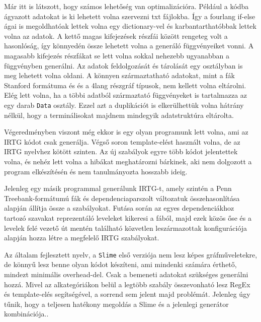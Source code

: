 Már itt is látszott, hogy számos lehetőség van optimalizációra. 
Például a kódba ágyazott adatokat is ki lehetett volna szervezni txt fájlokba. 
Így a fourlang if-else ágai is megoldhatóak lettek volna egy dictionary-vel és karbantarthatóbbak lettek volna az adatok. 
A kettő magas kifejezések részfái között rengeteg volt a hasonlóság, így könnyedén össze lehetett volna a generáló függvényeiket vonni. 
A magasabb kifejezés részfákat se lett volna sokkal nehezebb ugyanabban a függvényben generálni. 
Az adatok feldolgozását és tárolását egy osztályban is meg lehetett volna oldani. 
A könnyen származtatható adatokat, mint a fák Stanford formátuma és és a 4lang részgráf típusok, nem kellett volna eltárolni. 
Elég lett volna, ha a többi adatból származtató függvényeket is tartalmazza az egy darab \texttt{Data} osztály. 
Ezzel azt a duplikációt is elkerülhettük volna hátrány nélkül, hogy a terminálisokat majdnem mindegyik adatstruktúra eltárolta.

Végeredményben viszont még ekkor is egy olyan programunk lett volna, ami az IRTG kódot csak generálja. 
Végső soron template-elést használt volna, de az IRTG nyelvhez kötött szinten. 
Az új szabályok egyre több kódot jelentettek volna, és nehéz lett volna a hibákat meghatározni bárkinek, aki nem dolgozott a program elkészítésén és nem tanulmányozta hosszabb ideig.

Jelenleg egy másik programmal generálunk IRTG-t, amely szintén a Penn Treebank-formátumú fák és dependenciaparszolt változatuk összehasonlítása alapján állítja össze a szabályokat. 
Futása során az egyes dependenciákhoz tartozó szavakat reprezentáló leveleket kikeresi a fából, majd ezek közös őse és a levelek felé vezető út mentén található közvetlen leszármazottak konfigurációja alapján hozza létre a megfelelő IRTG szabályokat.

Az általam fejlesztett nyelv, a \texttt{Slime} első verziója nem lesz képes gráfműveletekre, de könnyű lesz benne olyan kódot készíteni, ami mindenki számára érthető, mindezt minimális overhead-del.
Csak a bemeneti adatokat szükséges generálni hozzá. 
Mivel az alkategóriákon belül a legtöbb szabály összevonható lesz RegEx és template-elés segítségével, a sorrend sem jelent majd problémát.
Jelenleg úgy tűnik, hogy a teljesen hatékony megoldás a Slime és a jelenlegi generátor kombinációja..